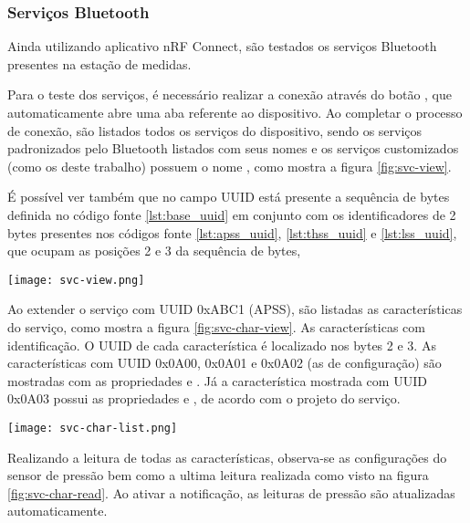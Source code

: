\subsubsection{Serviços Bluetooth}

Ainda utilizando aplicativo nRF Connect, são testados os serviços Bluetooth
presentes na estação de medidas.

Para o teste dos serviços, é necessário realizar a conexão através do botão
, que automaticamente abre uma aba referente ao dispositivo.
Ao completar o processo de conexão, são listados todos os serviços do
dispositivo, sendo os serviços padronizados pelo Bluetooth listados com seus
nomes e os serviços customizados (como os deste trabalho) possuem o nome
, como mostra a figura \ref{fig:svc-view}.

É possível ver também que no campo UUID está presente a sequência de bytes
definida no código fonte \ref{lst:base_uuid} em conjunto com os identificadores
de 2 bytes presentes nos códigos fonte \ref{lst:apss_uuid}, \ref{lst:thss_uuid}
e \ref{lst:lss_uuid}, que ocupam as posições 2 e 3 da sequência de bytes,

\begin{center}
	\centering 
	\texttt{[image: svc-view.png]}
	\label{fig:svc-view}
\end{center} 


Ao extender o serviço com UUID 0xABC1 (APSS), são listadas as características do
serviço, como mostra a figura \ref{fig:svc-char-view}. As características com
identificação. O UUID de cada característica é localizado nos bytes 2 e 3. As
características com UUID 0x0A00, 0x0A01 e 0x0A02 (as de configuração) são
mostradas com as propriedades  e . Já a
característica mostrada com UUID 0x0A03 possui as propriedades  e
, de acordo com o projeto do serviço.


\begin{center}
	\centering 
	\texttt{[image: svc-char-list.png]} 
	\label{fig:svc-char-view}
\end{center} 

Realizando a leitura de todas as características, observa-se as configurações do
sensor de pressão bem como a ultima leitura realizada como visto na figura
\ref{fig:svc-char-read}. Ao ativar a notificação, as leituras de pressão são
atualizadas automaticamente.



